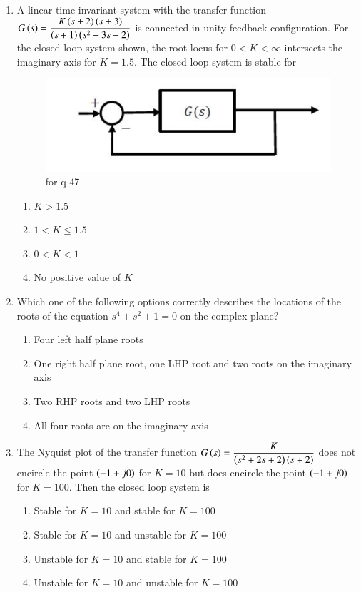 \documentclass[journal,12pt,onecolumn]{IEEEtran}
\theoremstyle{remark}
\begin{document}
\begin{enumerate}
\item A linear time invariant  system with the transfer function  
$G\left(s\right) = \dfrac{K\left(s+2\right)\left(s+3\right)}{\left(s+1\right)\left(s^2 - 3s + 2\right)}$  
is connected in unity feedback configuration. For the closed loop system shown, the root locus for $0 < K < \infty$ intersects the imaginary axis for $K = 1.5$. The closed loop system is stable for
\begin{figure}[H]
    \centering
    \includegraphics[width=0.5\columnwidth]{figs/20.png}
    \caption{\centering for q-47}
    \label{fig:placeholder_20}
\end{figure}
\begin{multicols}{2}
\begin{enumerate}
\item $K > 1.5$
\item $1 < K \leq 1.5$
\item $0 < K < 1$
\item No positive value of $K$
\end{enumerate}
\end{multicols}
\hfill {}

\item Which one of the following options correctly describes the locations of the roots of the equation $s^4 + s^2 + 1 = 0$ on the complex plane?
\begin{multicols}{2}
\begin{enumerate}
\item Four left half plane  roots
\item One right half plane  root, one LHP root and two roots on the imaginary axis
\item Two RHP roots and two LHP roots
\item All four roots are on the imaginary axis
\end{enumerate}
\end{multicols}
\hfill {}

\item The Nyquist plot of the transfer function  
$G\left(s\right) = \dfrac{K}{\left(s^2 + 2s + 2\right)\left(s + 2\right)}$  
does not encircle the point $\left(-1 + j0\right)$ for $K = 10$ but does encircle the point $\left(-1 + j0\right)$ for $K = 100$. Then the closed loop system  is
\begin{multicols}{2}
\begin{enumerate}
\item Stable for $K = 10$ and stable for $K = 100$
\item Stable for $K = 10$ and unstable for $K = 100$
\item Unstable for $K = 10$ and stable for $K = 100$
\item Unstable for $K = 10$ and unstable for $K = 100$
\end{enumerate}
\end{multicols}
\hfill {}


\end{enumerate}
\end{document}

